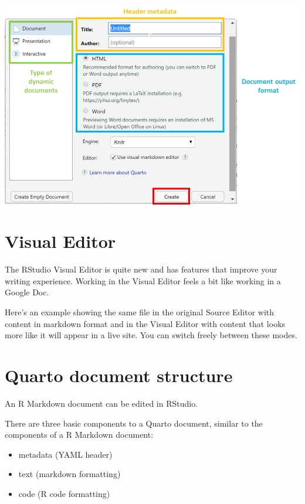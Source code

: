 \documentclass[
  letterpaper,
  DIV=11,
  numbers=noendperiod,
  oneside]{scrreprt}
\providecommand{\tightlist}{%
  \setlength{\itemsep}{0pt}\setlength{\parskip}{0pt}}\usepackage{longtable,booktabs,array}
\begin{document}
\includegraphics{images/paste-67B97E04.png}

\hypertarget{visual-editor}{%
\section{Visual Editor}\label{visual-editor}}

The RStudio Visual Editor is quite new and has features that improve
your writing experience. Working in the Visual Editor feels a bit like
working in a Google Doc.

Here's an example showing the same file in the original Source Editor
with content in markdown format and in the Visual Editor with content
that looks more like it will appear in a live site. You can switch
freely between these modes.

\hypertarget{quarto-document-structure}{%
\section{Quarto document structure}\label{quarto-document-structure}}

An R Markdown document can be edited in RStudio.

There are three basic components to a Quarto document, similar to the
components of a R Markdown document:

\begin{itemize}
\tightlist
\item
  metadata (YAML header)
\item
  text (markdown formatting)
\item
  code (R code formatting)
\end{itemize}
\end{document}
